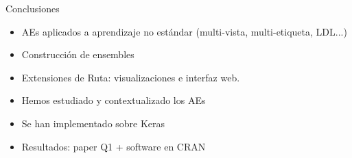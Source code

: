 \begin{frame}{Conclusiones}

\begin{itemize}
\item AEs aplicados a aprendizaje \alert{no estándar} (multi-vista, multi-etiqueta, LDL...)
\item Construcción de \alert{ensembles}
\item Extensiones de Ruta: visualizaciones e interfaz web.


\end{itemize}

\begin{itemize}
\item Hemos estudiado y contextualizado los AEs
\item Se han implementado sobre Keras
\item Resultados: paper Q1 + software en CRAN
\end{itemize}

\end{frame}

\maketitle

